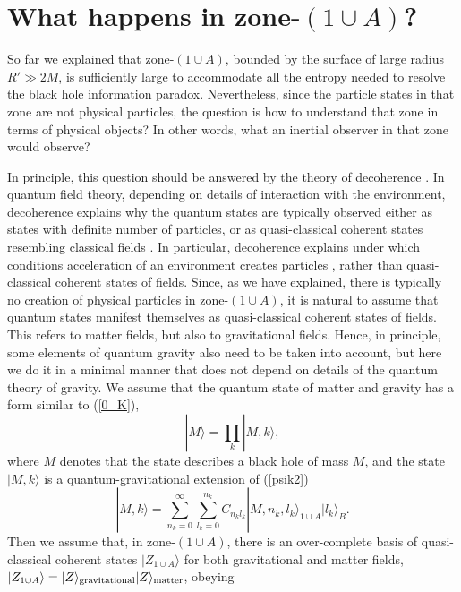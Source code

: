 \documentclass[12pt]{article}
\begin{document}
\section{What happens in zone-$(1\!\cup\! A)$?}

So far we explained that zone-$(1\!\cup\! A)$, 
bounded by the surface of large radius $R'\gg 2M$, is sufficiently large to accommodate all the entropy needed to resolve
the black hole information paradox. Nevertheless, since the particle states in that zone are not physical particles, 
the question is how to understand that zone in terms of physical objects?
In other words, what an inertial observer in that zone would observe?

In principle, this question should be answered by the theory of decoherence \cite{decoh1,decoh2}. 
In quantum field theory, depending on details of interaction with the environment, decoherence 
explains why the quantum states are typically observed either as states with definite number of particles, 
or as quasi-classical coherent states resembling classical fields \cite{zeh,zurek}.
In particular, decoherence explains under which conditions acceleration of an environment creates particles    
\cite{hu,audretsch,kok}, rather than quasi-classical coherent states of fields. 
Since, as we have explained, there is typically no creation of physical particles in zone-$(1\!\cup\! A)$,
it is natural to assume that quantum states manifest themselves as quasi-classical coherent states of fields.   
This refers to matter fields, but also to gravitational fields. Hence, in principle, some elements of quantum 
gravity also need to be taken into account, but here we do it in a minimal manner that does not depend on 
details of the quantum theory of gravity. We assume that the quantum state of matter and gravity has a form 
similar to (\ref{0_K}), 
\begin{equation}\label{M}
|M\rangle = \prod_k |M,k\rangle , 
\end{equation}
where $M$ denotes that the state describes a black hole of mass $M$,
and the state $|M,k\rangle$ is a quantum-gravitational extension of (\ref{psik2})
\begin{equation}\label{psik4}
 |M,k\rangle = \sum_{n_k=0}^{\infty} \sum_{l_k=0}^{n_k} C_{n_kl_k} |M,n_k,l_k\rangle_{1\cup A} |l_k\rangle_B .
\end{equation}
Then we assume that, in zone-$(1\!\cup\! A)$,
there is an over-complete basis of quasi-classical coherent states $|Z_{1\cup A}\rangle$ 
for both gravitational and matter fields, $|Z_{1\cup A}\rangle=|Z\rangle_{\rm gravitational}|Z\rangle_{\rm matter}$, obeying 
\end{document}
